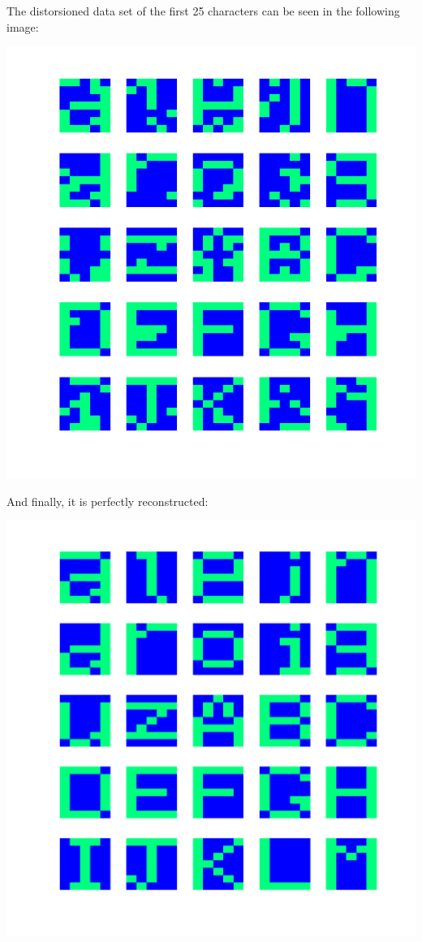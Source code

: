 \documentclass[10pt]{article}
\begin{document}
\begin{multicols}{2}
  The distorsioned data set of the first 25 characters can be seen in the following image:
  \begin{center}
    \includegraphics[width=\linewidth]{img/noisy25}
  \end{center}

  And finally, it is perfectly reconstructed:
  \begin{center}
    \includegraphics[width=\linewidth]{img/reconstructed25}
  \end{center}


\end{multicols}
\end{document}
